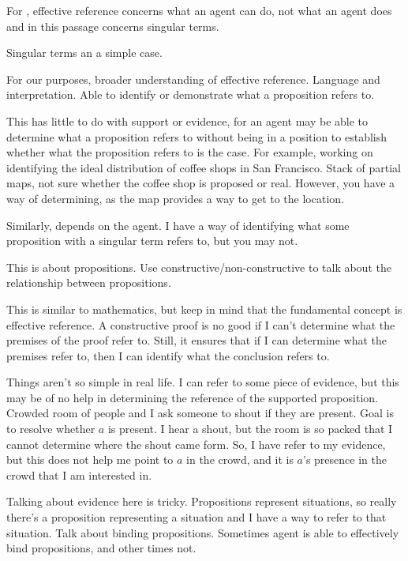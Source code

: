 \documentclass[10pt]{article}
\begin{document}
For \citeauthor{Over:1983ab}, effective reference concerns what an agent can do, not what an agent does and in this passage concerns singular terms.

Singular terms an a simple case.

For our purposes, broader understanding of effective reference.
Language and interpretation.
Able to identify or demonstrate what a proposition refers to.

This has little to do with support or evidence, for an agent may be able to determine what a proposition refers to without being in a position to establish whether what the proposition refers to is the case.
For example, working on identifying the ideal distribution of coffee shops in San Francisco.
Stack of partial maps, not sure whether the coffee shop is proposed or real.
However, you have a way of determining, as the map provides a way to get to the location.

Similarly, depends on the agent.
I have a way of identifying what some proposition with a singular term refers to, but you may not.


This is about propositions.
Use constructive/non-constructive to talk about the relationship between propositions.

This is similar to mathematics, but keep in mind that the fundamental concept is effective reference.
A constructive proof is no good if I can't determine what the premises of the proof refer to.
Still, it ensures that if I can determine what the premises refer to, then I can identify what the conclusion refers to.

Things aren't so simple in real life.
I can refer to some piece of evidence, but this may be of no help in determining the reference of the supported proposition.
Crowded room of people and I ask someone to shout if they are present.
Goal is to resolve whether \(a\) is present.
I hear a shout, but the room is so packed that I cannot determine where the shout came form.
So, I have refer to my evidence, but this does not help me point to \(a\) in the crowd, and it is \(a\)'s presence in the crowd that I am interested in.

Talking about evidence here is tricky.
Propositions represent situations, so really there's a proposition representing a situation and I have a way to refer to that situation.
Talk about binding propositions.
Sometimes agent is able to effectively bind propositions, and other times not.
\end{document}
